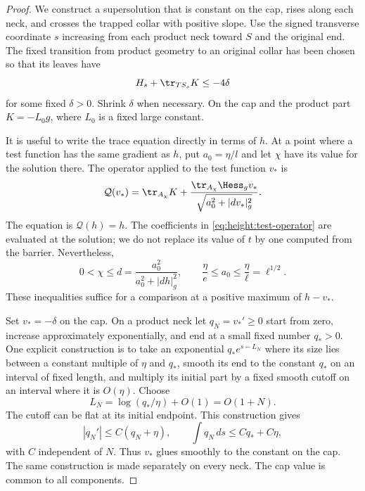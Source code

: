 \begin{proof}
We construct a supersolution that is constant on the cap, rises along
each neck, and crosses the trapped collar with positive slope.  Use the
signed transverse coordinate $s$ increasing from each product
neck toward $S$ and the original end.  The fixed transition from product
geometry to an original collar has been chosen so that its leaves have
\begin{equation}\label{eq:height:leaf-expansion}
 H_s+\tr_{TS_s}K\le-4\delta
\end{equation}
for some fixed $\delta>0$.  Shrink $\delta$ when necessary.  On the cap
and the product part $K=-L_0g$, where $L_0$ is a fixed large constant.

It is useful to write the trace equation directly in terms of $h$.  At a
point where a test function has the same gradient as $h$, put
$a_0=\eta/l$ and let $\chi$ have its value for the solution there.  The
operator applied to the test function $v_*$ is
\begin{equation}\label{eq:height:test-operator}
 \mathcal Q(v_*)=
 \tr_{A_\chi}K+
 \frac{\tr_{A_\chi}\Hess_g v_*}
 {\sqrt{a_0^2+|dv_*|_g^2}}.
\end{equation}
The equation is $\mathcal Q(h)=h$.  The coefficients in
\eqref{eq:height:test-operator} are evaluated at the solution;
we do not replace its value of $t$ by one computed from the barrier.
Nevertheless,
\begin{equation}\label{eq:height:axial-smallness}
 0<\chi\le d=\frac{a_0^2}{a_0^2+|dh|_g^2},
 \qquad \frac\eta e\le a_0\le\frac\eta\ell=\ell^{1/2}.
\end{equation}
These inequalities suffice for a comparison at a positive maximum of
$h-v_*$.

Set $v_*=-\delta$ on the cap.  On a product neck let
$q_N=v_*'\ge0$ start from zero, increase approximately exponentially,
and end at a small fixed number $q_*>0$.  One explicit construction is
to take an exponential $q_*e^{s-L_N}$ where its size lies between a
constant multiple of $\eta$ and $q_*$, smooth its end to the constant
$q_*$ on an interval of fixed length, and multiply its initial part by
a fixed smooth cutoff on an interval where it is $O(\eta)$.  Choose
\[
 L_N=\log(q_*/\eta)+O(1)=O(1+N).
\]
The cutoff can be flat at its initial endpoint.  This construction gives
\begin{equation}\label{eq:height:ramp-estimates}
 |q_N'|\le C(q_N+\eta),\qquad
 \int q_N\,ds\le Cq_*+C\eta,
\end{equation}
with $C$ independent of $N$.  Thus $v_*$ glues smoothly to the constant
on the cap.  The same construction is made separately on every neck.
The cap value is common to all components.


\end{proof}
